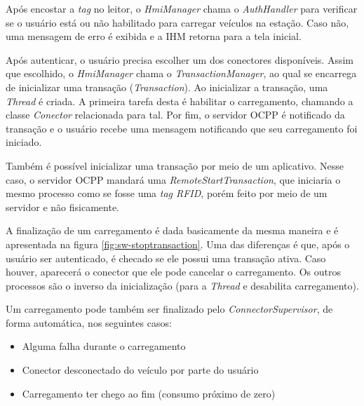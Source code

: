       Após encostar a \textit{tag} no leitor, o \textit{HmiManager} chama o \textit{AuthHandler} para verificar se o usuário está ou não habilitado para carregar veículos na estação. Caso não, uma mensagem de erro é exibida e a \ac{IHM} retorna para a tela inicial.

      Após autenticar, o usuário precisa escolher um dos conectores disponíveis. Assim que escolhido, o \textit{HmiManager} chama o \textit{TransactionManager}, ao qual se encarrega de inicializar uma transação (\textit{Transaction}). Ao inicializar a transação, uma \textit{Thread} é criada. A primeira tarefa desta é habilitar o carregamento, chamando a classe \textit{Conector} relacionada para tal. Por fim, o servidor \ac{OCPP} é notificado da transação e o usuário recebe uma mensagem notificando que seu carregamento foi iniciado.

      Também é possível inicializar uma transação por meio de um aplicativo. Nesse caso, o servidor OCPP mandará uma \textit{RemoteStartTransaction}, que iniciaria o mesmo processo como se fosse uma \textit{tag RFID}, porém feito por meio de um servidor e não fisicamente.

      A finalização de um carregamento é dada basicamente da mesma maneira e é apresentada na figura \ref{fig:sw-stoptransaction}. Uma das diferenças é que, após o usuário ser autenticado, é checado se ele possui uma transação ativa. Caso houver, aparecerá o conector que ele pode cancelar o carregamento. Os outros processos são o inverso da inicialização (para a \textit{Thread} e desabilita carregamento).

      Um carregamento pode também ser finalizado pelo \textit{ConnectorSupervisor}, de forma automática, nos seguintes casos: 

      \begin{itemize}
        \item Alguma falha durante o carregamento
        \item Conector desconectado do veículo por parte do usuário
        \item Carregamento ter chego ao fim (consumo próximo de zero)
      \end{itemize}

